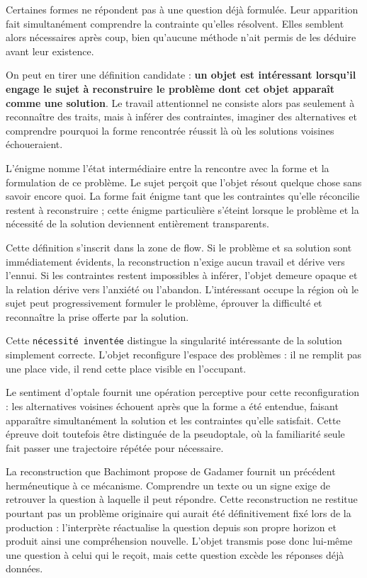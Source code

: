 \documentclass[10pt,a4paper]{article}
\begin{document}
Certaines formes ne répondent pas à une question déjà formulée. Leur apparition fait simultanément comprendre la contrainte qu'elles résolvent. Elles semblent alors nécessaires après coup, bien qu'aucune méthode n'ait permis de les déduire avant leur existence.

On peut en tirer une définition candidate : \textbf{un objet est intéressant lorsqu'il engage le sujet à reconstruire le problème dont cet objet apparaît comme une solution}. Le travail attentionnel ne consiste alors pas seulement à reconnaître des traits, mais à inférer des contraintes, imaginer des alternatives et comprendre pourquoi la forme rencontrée réussit là où les solutions voisines échoueraient.

L'énigme nomme l'état intermédiaire entre la rencontre avec la forme et la formulation de ce problème. Le sujet perçoit que l'objet résout quelque chose sans savoir encore quoi. La forme fait énigme tant que les contraintes qu'elle réconcilie restent à reconstruire ; cette énigme particulière s'éteint lorsque le problème et la nécessité de la solution deviennent entièrement transparents.

Cette définition s'inscrit dans la zone de flow. Si le problème et sa solution sont immédiatement évidents, la reconstruction n'exige aucun travail et dérive vers l'ennui. Si les contraintes restent impossibles à inférer, l'objet demeure opaque et la relation dérive vers l'anxiété ou l'abandon. L'intéressant occupe la région où le sujet peut progressivement formuler le problème, éprouver la difficulté et reconnaître la prise offerte par la solution.

Cette \texttt{nécessité inventée} distingue la singularité intéressante de la solution simplement correcte. L'objet reconfigure l'espace des problèmes : il ne remplit pas une place vide, il rend cette place visible en l'occupant.

Le sentiment d'optale fournit une opération perceptive pour cette reconfiguration : les alternatives voisines échouent après que la forme a été entendue, faisant apparaître simultanément la solution et les contraintes qu'elle satisfait. Cette épreuve doit toutefois être distinguée de la pseudoptale, où la familiarité seule fait passer une trajectoire répétée pour nécessaire.

La reconstruction que Bachimont propose de Gadamer fournit un précédent herméneutique à ce mécanisme. Comprendre un texte ou un signe exige de retrouver la question à laquelle il peut répondre. Cette reconstruction ne restitue pourtant pas un problème originaire qui aurait été définitivement fixé lors de la production : l'interprète réactualise la question depuis son propre horizon et produit ainsi une compréhension nouvelle. L'objet transmis pose donc lui-même une question à celui qui le reçoit, mais cette question excède les réponses déjà données.
\end{document}

